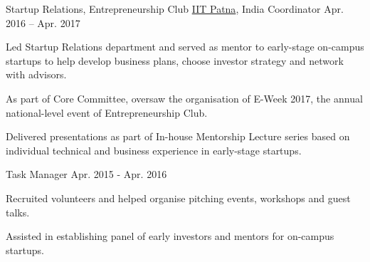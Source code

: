 \begin{cvpositions}
\cvroletwo
	{Startup Relations, Entrepreneurship Club} %
	{\href{https://www.iitp.ac.in}{IIT Patna}, India} %
	{Coordinator} %
	{Apr. 2016 -- Apr. 2017} %
	{\begin{cvitems} %
		\item {Led Startup Relations department and served as mentor to early-stage on-campus startups to help develop business plans, choose investor strategy and network with advisors.}
		\item {As part of Core Committee, oversaw the organisation of E-Week 2017, the annual national-level event of Entrepreneurship Club.}
		\item {Delivered presentations as part of In-house Mentorship Lecture series based on individual technical and business experience in early-stage startups.}
	\end{cvitems}}
	{Task Manager} %
	{Apr. 2015 - Apr. 2016} %
	{\begin{cvitems} %
		\item {Recruited volunteers and helped organise pitching events, workshops and guest talks.}
		\item {Assisted in establishing panel of early investors and mentors for on-campus startups.}
	\end{cvitems}}

\end{cvpositions}
